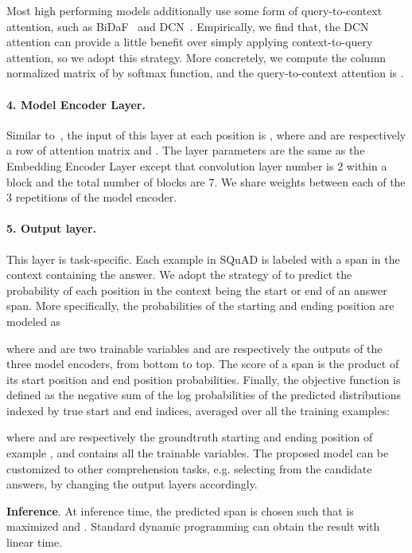 \documentclass{article} \usepackage{iclr2018_conference,times}
\begin{document}
Most high performing models additionally use some form of query-to-context attention, such as BiDaF~\citep{SeoKFH16} and DCN~\citep{XiongZS16}.
Empirically, we find that, the DCN attention can provide a little benefit over simply applying context-to-query attention, so we adopt this strategy. More concretely, we compute the column normalized matrix  of  by softmax function, and the query-to-context attention is 
.

\paragraph{4. Model Encoder Layer.} Similar to~\cite{SeoKFH16}, the input of this layer at each position is , where  and  are respectively a row of attention matrix  and . The layer parameters are the same as the Embedding Encoder Layer except that convolution layer number is 2 within a block and the total number of blocks are 7.  We share weights between each of the 3 repetitions of the model encoder.

\paragraph{5. Output layer.} This layer is task-specific. Each example in SQuAD is labeled with a span in the context containing the answer.  We adopt the strategy of \cite{SeoKFH16} to predict the probability of each position in the context being the start or end of an answer span. 
More specifically, the probabilities of the starting and ending position are modeled as

where  and  are two trainable variables and  are respectively the outputs of the three model encoders, from bottom to top.
The score of a span is the product of its start position and end position probabilities.
Finally, the objective function is defined as the negative sum of the log probabilities
of the predicted distributions indexed by true start and end indices, averaged over all the training examples:

where  and  are respectively the groundtruth starting and ending position of example , and  contains all the trainable variables.
The proposed model can be customized to other comprehension tasks, e.g. selecting from the candidate answers, by changing the output layers accordingly. 

\textbf{Inference}. At inference time, the predicted span  is chosen such that  is maximized and . Standard dynamic programming can obtain the result with linear time.
\end{document}
